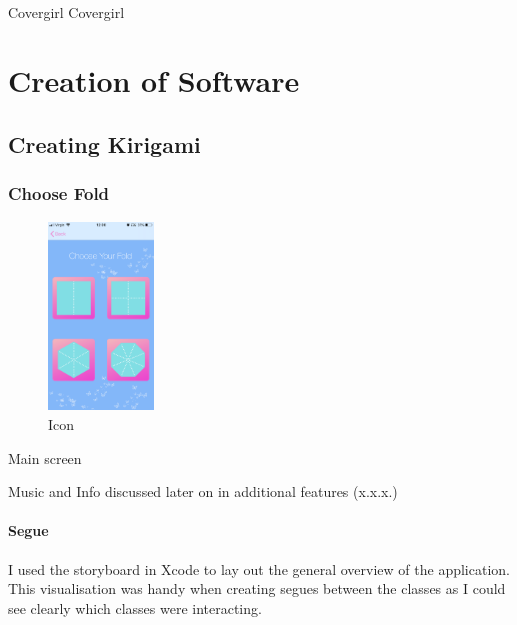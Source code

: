 \documentclass[11pt]{article}
\begin{document}
            
                \paragraph{}
                Covergirl Covergirl
            

\newpage
\section{Creation of Software}

    
    \subsection{Creating Kirigami}
            \paragraph{}
            \subsubsection{Choose Fold}
                \begin{figure}
                        \centering
                        \includegraphics[width=0.25\textwidth]{KiriZen/chooseFold.png}
                        \caption{Icon}
                        \label{fig:kiriZen-chooseFold}
                    \end{figure}
                    
            Main screen
            
            Music and Info discussed later on in additional features (x.x.x.)
            
          
            \paragraph{Segue}
                I used the storyboard in Xcode to lay out the general overview of the application. This visualisation was handy when creating segues between the classes as I could see clearly which classes were interacting. 
                
\end{document}

